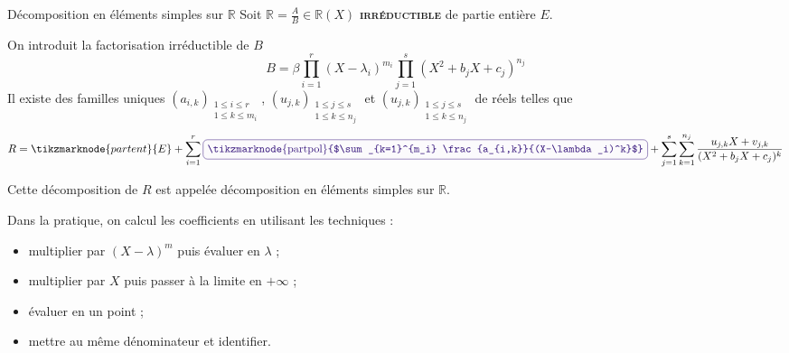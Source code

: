     \begin{theo}{Décomposition en éléments simples sur $\mathbb{R}$}{}
        Soit $\mathbb{R} = \frac{A}{B} \in \mathbb{R}(X)$ \textbf{\textsc{irréductible}} de partie entière $E$.
        
        On introduit la factorisation irréductible de $B$
        \[ B = \beta \prod_{i=1}^{r}(X - \lambda_i)^{m_i} \prod_{j=1}^{s} (X^2 + b_j X + c_j)^{n_j} \]
        Il existe des familles uniques $(a_{i,k})_{\substack{1 \leq i \leq r \\ 1 \leq k \leq m_i}}$, $(u_{j,k})_{\substack{1 \leq j \leq s \\ 1 \leq k \leq n_j}}$ et $(u_{j,k})_{\substack{1 \leq j \leq s \\ 1 \leq k \leq n_j}}$ de réels telles que 
        \[ R = \tikzmarknode{partent}{E} + \sum_{i=1}^{r} \lilbox{mypurple}{\tikzmarknode{partpol}{$\sum_{k=1}^{m_i} \frac{a_{i,k}}{(X-\lambda_i)^k}$}} + \sum_{j=1}^{s} \sum_{k=1}^{n_j} \frac{u_{j,k}X + v_{j,k}}{(X^2 + b_j X + c_j)^k} \]
        \begin{center}\footnotesize 
            \hspace*{5cm}
        \end{center}
        Cette décomposition de $R$ est appelée décomposition en éléments simples sur $\mathbb{R}$.
    \end{theo}

    Dans la pratique, on calcul les coefficients en utilisant les techniques :
    \begin{itemize}
        \item multiplier par $(X - \lambda)^m$ puis évaluer en $\lambda$ ;
        \item multiplier par $X$ puis passer à la limite en $+\infty$ ;
        \item évaluer en un point ;
        \item mettre au même dénominateur et identifier.
    \end{itemize}

